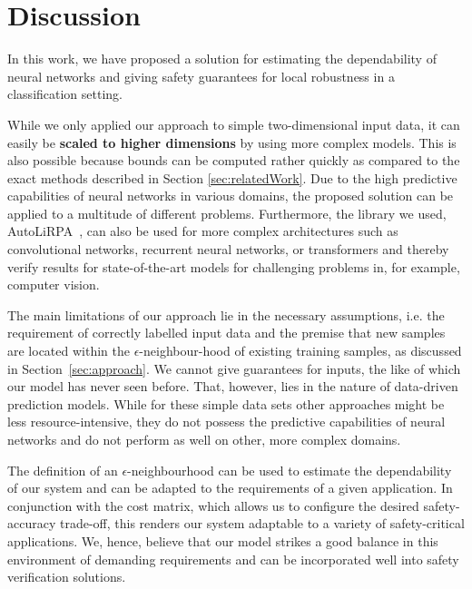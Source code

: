 \documentclass[acmsmall,nonacm]{acmart}
\begin{document}
\section{Discussion}
In this work, we have proposed a solution for estimating the dependability of neural networks and giving safety guarantees for local robustness in a classification setting.

While we only applied our approach to simple two-dimensional input data, it can easily be \textbf{scaled to higher dimensions} by using more complex models. This is also possible because bounds can be computed rather quickly as compared to the exact methods described in Section \ref{sec:relatedWork}. Due to the high predictive capabilities of neural networks in various domains, the proposed solution can be applied to a multitude of different problems. Furthermore, the library we used, AutoLiRPA~\cite{xu2020autoLiRPA}, can also be used for more complex architectures such as convolutional networks, recurrent neural networks, or transformers and thereby verify results for state-of-the-art models for challenging problems in, for example, computer vision.

The main limitations of our approach lie in the necessary assumptions, i.e. the requirement of correctly labelled input data and the premise that new samples are located within the $\epsilon$-neighbour-hood of existing training samples, as discussed in Section~\ref{sec:approach}. We cannot give guarantees for inputs, the like of which our model has never seen before. That, however, lies in the nature of data-driven prediction models. While for these simple data sets other approaches might be less resource-intensive, they do not possess the predictive capabilities of neural networks and do not perform as well on other, more complex domains.

The definition of an $\epsilon$-neighbourhood can be used to estimate the dependability of our system and can be adapted to the requirements of a given application. In conjunction with the cost matrix, which allows us to configure the desired safety-accuracy trade-off, this renders our system adaptable to a variety of safety-critical applications. We, hence, believe that our model strikes a good balance in this environment of demanding requirements and can be incorporated well into safety verification solutions. 

\pagebreak  




\end{document}
